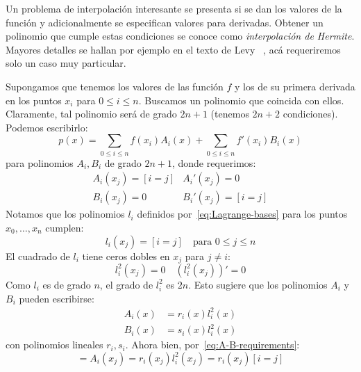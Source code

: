   Un problema de interpolación interesante se presenta
  si se dan los valores de la función
  y adicionalmente se especifican valores para derivadas.
  Obtener un polinomio que cumple estas condiciones
  se conoce como \emph{interpolación de Hermite}.
  Mayores detalles se hallan por ejemplo en el texto de Levy~%
    \cite{levy10:_introd_numer_analy},
  acá requeriremos solo un caso muy particular.

  Supongamos que tenemos los valores de las función \(f\)
  y los de su primera derivada en los puntos \(x_i\)
  para \(0 \le i \le n\).
  Buscamos un polinomio que coincida con ellos.
  Claramente,
  tal polinomio será de grado \(2 n + 1\)
  (tenemos \(2 n + 2\) condiciones).
  Podemos escribirlo:
  \begin{equation}
    \label{eq:Hermite-A-B}
    p(x)
      = \sum_{0 \le i \le n} f(x_i) A_i(x)
          + \sum_{0 \le i \le n} f'(x_i) B_i(x)
  \end{equation}
  para polinomios \(A_i, B_i\) de grado \(2 n + 1\),
  donde requerimos:
  \begin{equation}
    \label{eq:A-B-requirements}
    \begin{array}{ll}
      A_i(x_j) = [i = j] & A_i'(x_j) = 0 \\
      B_i(x_j) = 0	 & B_i'(x_j) = [i = j]
    \end{array}
  \end{equation}
  Notamos que los polinomios \(l_i\) definidos por~\eqref{eq:Lagrange-bases}
  para los puntos \(x_0, \dotsc, x_n\) cumplen:
  \begin{equation*}
    l_i(x_j)
      = [i = j]
        \quad \text{para \(0 \le j \le n\)}
  \end{equation*}
  El cuadrado de \(l_i\) tiene ceros dobles en \(x_j\) para \(j \ne i\):
  \begin{equation*}
    l_i^2(x_j) = 0
      \quad \left( l_i^2(x_j) \right)' = 0
  \end{equation*}
  Como \(l_i\) es de grado \(n\),
  el grado de \(l_i^2\) es \(2 n\).
  Esto sugiere que los polinomios \(A_i\) y \(B_i\) pueden escribirse:
  \begin{align*}
    A_i(x)
      &= r_i(x) l_i^2(x) \\
    B_i(x)
      &= s_i(x) l_i^2(x)
  \end{align*}
  con polinomios lineales \(r_i, s_i\).
  Ahora bien,
  por~\eqref{eq:A-B-requirements}:
  \begin{equation*}
    [i = j]
      = A_i(x_j)
      = r_i(x_j) l_i^2(x_j)
      = r_i(x_j) [i = j]
  \end{equation*}

